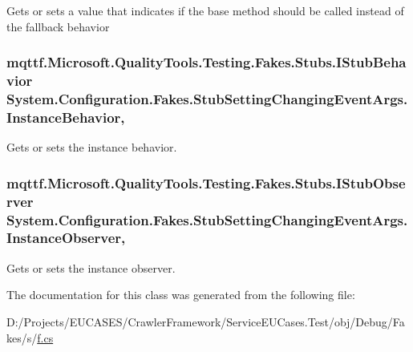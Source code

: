 Gets or sets a value that indicates if the base method should be called instead of the fallback behavior

\hypertarget{class_system_1_1_configuration_1_1_fakes_1_1_stub_setting_changing_event_args_a30e506c45d1b8bff9cba42921ec242ce}{
\subsubsection[{Instance\-Behavior}]{\setlength{\rightskip}{0pt plus 5cm}mqttf.\-Microsoft.\-Quality\-Tools.\-Testing.\-Fakes.\-Stubs.\-I\-Stub\-Behavior System.\-Configuration.\-Fakes.\-Stub\-Setting\-Changing\-Event\-Args.\-Instance\-Behavior\hspace{0.3cm}{\ttfamily [get]}, {\ttfamily [set]}}}\label{class_system_1_1_configuration_1_1_fakes_1_1_stub_setting_changing_event_args_a30e506c45d1b8bff9cba42921ec242ce}


Gets or sets the instance behavior.

\hypertarget{class_system_1_1_configuration_1_1_fakes_1_1_stub_setting_changing_event_args_a3831387e4f33666c18425c5ed127d87e}{
\subsubsection[{Instance\-Observer}]{\setlength{\rightskip}{0pt plus 5cm}mqttf.\-Microsoft.\-Quality\-Tools.\-Testing.\-Fakes.\-Stubs.\-I\-Stub\-Observer System.\-Configuration.\-Fakes.\-Stub\-Setting\-Changing\-Event\-Args.\-Instance\-Observer\hspace{0.3cm}{\ttfamily [get]}, {\ttfamily [set]}}}\label{class_system_1_1_configuration_1_1_fakes_1_1_stub_setting_changing_event_args_a3831387e4f33666c18425c5ed127d87e}


Gets or sets the instance observer.



The documentation for this class was generated from the following file\-:\begin{DoxyCompactItemize}
\item 
D\-:/\-Projects/\-E\-U\-C\-A\-S\-E\-S/\-Crawler\-Framework/\-Service\-E\-U\-Cases.\-Test/obj/\-Debug/\-Fakes/s/\hyperlink{s_2f_8cs}{f.\-cs}\end{DoxyCompactItemize}
